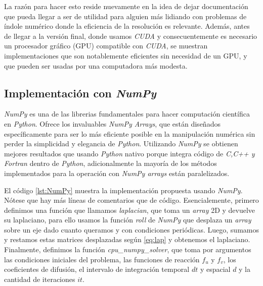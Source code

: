 La razón para hacer esto reside nuevamente en la idea de dejar documentación que pueda llegar a ser de utilidad para alguien más lidiando 
con problemas de índole numérico donde la eficiencia de la resolución es relevante. Además, antes de llegar a la versión final, donde usamos \textit{CUDA} y 
consecuentemente es necesario un procesador gráfico (GPU) compatible con \textit{CUDA}, se muestran implementaciones que son notablemente eficientes sin necesidad 
de un GPU, y que pueden ser usadas por una computadora más modesta.

\subsection{Implementación con \textit{NumPy}}
\label{SS:NumPy}
\textit{NumPy} es una de las librerias fundamentales para hacer computación científica en \textit{Python}. Ofrece los invaluables \textit{NumPy Arrays}, que están diseñados 
específicamente para ser lo más eficiente posible en la manipulación numérica sin perder la simplicidad y elegancia de \textit{Python}. Utilizando \textit{NumPy} 
se obtienen mejores resultados que usando \textit{Python} nativo porque integra código de \textit{C,C++ y Fortran} dentro de \textit{Python}, adicionalmente la mayoría 
de los métodos implementados para la operación con \textit{NumPy arrays} están paralelizados.

El código \ref{lst:NumPy} muestra la implementación propuesta usando \textit{NumPy}. Nótese que hay más líneas de comentarios que de código. Esencialemente, 
primero definimos una función que llamamos \textit{laplacian}, que toma un \textit{array} 2D 
y devuelve su laplaciano, para ello usamos la función \textit{roll} de \textit{NumPy} que desplaza un \textit{array} sobre un eje dado
cuanto queramos y con condiciones periódicas.
Luego, sumamos y restamos estas matrices desplazadas según \ref{eq:lap} y obtenemos el laplaciano. Finalmente, definimos la función \textit{cpu\_numpy\_solver}, que toma 
por argumentos las condiciones iniciales del problema, las funciones de reacción $f_u$ y $f_v$, los coeficientes de difusión, 
el intervalo de integración temporal $dt$ y espacial $d$ y la cantidad de iteraciones $it$. 

